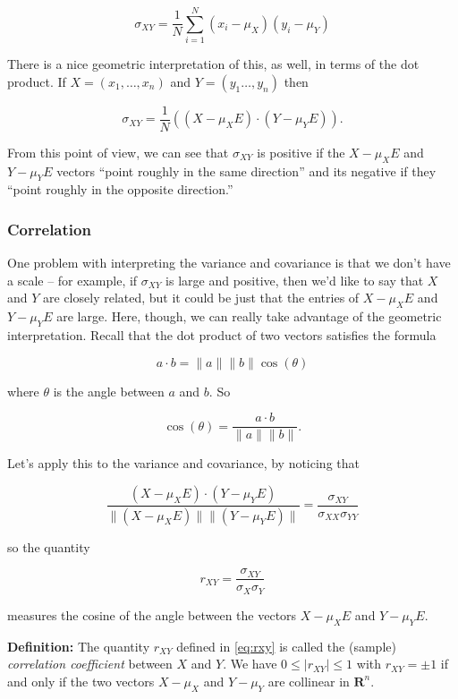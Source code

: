 \documentclass[
]{article}
\begin{document}
\begin{equation}
\sigma_{XY} = \frac{1}{N}\sum_{i=1}^{N} (x_i-\mu_{X})(y_i-\mu_{Y})
\label{eq:covariancedot}\end{equation}

There is a nice geometric interpretation of this, as well, in terms of
the dot product. If \(X=(x_1,\ldots, x_n)\) and \(Y=(y_1\ldots,y_n)\)
then

\[
\sigma_{XY} = \frac{1}{N} ((X-\mu_{X}E)\cdot (Y-\mu_{Y}E)).
\]

From this point of view, we can see that \(\sigma_{XY}\) is positive if
the \(X-\mu_{X}E\) and \(Y-\mu_{Y}E\) vectors ``point roughly in the
same direction'' and its negative if they ``point roughly in the
opposite direction.''

\hypertarget{correlation}{%
\subsubsection{Correlation}\label{correlation}}

One problem with interpreting the variance and covariance is that we
don't have a scale -- for example, if \(\sigma_{XY}\) is large and
positive, then we'd like to say that \(X\) and \(Y\) are closely
related, but it could be just that the entries of \(X-\mu_{X}E\) and
\(Y-\mu_{Y}E\) are large. Here, though, we can really take advantage of
the geometric interpretation. Recall that the dot product of two vectors
satisfies the formula

\[
a \cdot b = \|a\|\|b\|\cos(\theta)
\]

where \(\theta\) is the angle between \(a\) and \(b\). So

\[
\cos(\theta) = \frac{a\cdot b}{\|a\|\|b\|}.
\]

Let's apply this to the variance and covariance, by noticing that

\[
\frac{(X-\mu_{X}E)\cdot (Y-\mu_{Y}E)}{\|(X-\mu_{X}E)\|\|(Y-\mu_{Y}E)\|} = \frac{\sigma_{XY}}{\sigma_{XX}\sigma_{YY}}
\]

so the quantity

\begin{equation}
r_{XY} = \frac{\sigma_{XY}}{\sigma_{X}\sigma_{Y}}
\label{eq:rxy}\end{equation}

measures the cosine of the angle between the vectors \(X-\mu_{X}E\) and
\(Y-\mu_{Y}E\).

\textbf{Definition:} The quantity \(r_{XY}\) defined in \cref{eq:rxy} is
called the (sample) \emph{correlation coefficient} between \(X\) and
\(Y\). We have \(0\le |r_{XY}|\le 1\) with \(r_{XY}=\pm 1\) if and only
if the two vectors \(X-\mu_{X}\) and \(Y-\mu_{Y}\) are collinear in
\(\mathbf{R}^{n}\).
\end{document}
